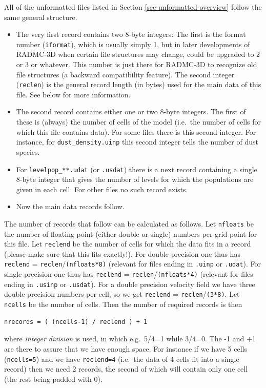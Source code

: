 \documentclass{report}
\newenvironment{asciibox}%
  {\begin{list}{}{%
    \setlength{\topsep}{0.5em}%
    \setlength{\parskip}{0em}%
    \setlength{\parsep}{0em}%
    \setlength{\itemsep}{0em}%
    \setlength{\rightmargin}{0em}%
    \setlength{\leftmargin}{3.0em}%
    \setlength{\labelsep}{1em}%
    \setlength{\labelwidth}{2em}%
  }\normalfont\footnotesize\item}
  {\end{list}}
\begin{document}
All of the unformatted files listed in Section
\ref{sec-unformatted-overview} follow the same general structure. 
\begin{itemize}
\item The very first record contains two 8-byte integers: The first is the
  format number ({\small\tt iformat}), which is usually simply 1, but in
  later developments of RADMC-3D when certain file structures may change,
  could be upgraded to 2 or 3 or whatever. This number is just there for
  RADMC-3D to recognize old file structures (a backward compatibility
  feature). The second integer ({\small\tt reclen}) is the general record
  length (in bytes) used for the main data of this file. See below for more
  information.
\item The second record contains either one or two 8-byte integers. The
  first of these is (always) the number of cells of the model (i.e.\ the
  number of cells for which this file contains data). For some files there
  is this second integer. For instance, for {\small\tt dust\_density.uinp}
  this second integer tells the number of dust species.
\item For {\small\tt levelpop\_**.udat} (or {\small\tt .usdat}) there is
  a next record containing a single 8-byte integer that gives the number 
  of levels for which the populations are given in each cell. For other
  files no such record exists.
\item Now the main data records follow. 
\end{itemize}
The number of records that follow can be calculated as follows. Let
{\small\tt nfloats} be the number of floating point (either double or
single) numbers per grid point for this file. Let {\small\tt reclend} be the
number of cells for which the data fits in a record (please make sure that
this fits exactly!). For double precision one thus has {\small\tt reclend} =
{\small\tt reclen}/{\small\tt (nfloats*8)} (relevant for files ending in
{\small\tt .uinp} or {\small\tt .udat}). For single precision one thus has
{\small\tt reclend} = {\small\tt reclen}/{\small\tt (nfloats*4)} (relevant
for files ending in {\small\tt .usinp} or {\small\tt .usdat}). For a double
precision velocity field we have three double precision numbers per cell, so
we get {\small\tt reclend} = {\small\tt reclen}/{\small\tt (3*8)}. Let
{\small\tt ncells} be the number of cells. Then the number of required
records is then
\begin{asciibox}\begin{verbatim}
nrecords = ( (ncells-1) / reclend ) + 1
\end{verbatim}\end{asciibox}
where {\em integer division} is used, in which e.g.\ 5/4=1 while 3/4=0. The
-1 and +1 are there to assure that we have enough space. For instance if we
have 5 cells ({\small\tt ncells=5}) and we have {\small\tt reclend=4} (i.e.\
the data of 4 cells fit into a single record) then we need 2 records, the
second of which will contain only one cell (the rest being padded with 0).
\end{document}
